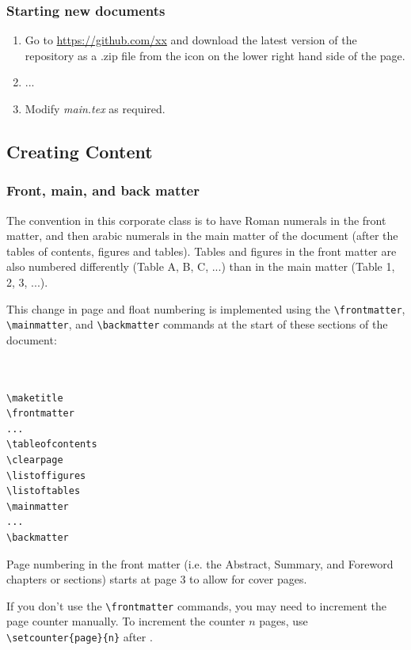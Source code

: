 \subsubsection{Starting new documents}
\begin{enumerate}
\item Go to \href{https://github.com/xx}{https://github.com/xx} and download the latest version of the repository as a .zip file from the icon on the lower right hand side of the page.
\item ...
\item Modify \emph{main.tex} as required.
\end{enumerate}

\subsection{Creating Content}
\subsubsection{Front, main, and back matter}
The convention in this corporate class is to have Roman numerals in the front matter, and then arabic numerals in the main matter of the document (after the tables of contents, figures and tables). Tables and figures in the front matter are also numbered differently (Table A, B, C, ...) than in the main matter (Table 1, 2, 3, ...).

This change in page and float numbering is implemented using the \verb+\frontmatter+, \verb+\mainmatter+, and \verb+\backmatter+ commands at the start of these sections of the document:

\begin{lstlisting}


\maketitle
\frontmatter
...
\tableofcontents
\clearpage
\listoffigures
\listoftables
\mainmatter
...
\backmatter

\end{lstlisting}

Page numbering in the front matter (i.e. the Abstract, Summary, and Foreword chapters or sections) starts at page 3 to allow for cover pages.

If you don't use the \verb+\frontmatter+ commands, you may need to increment the page counter manually. To increment the counter $n$ pages, use \verb+\setcounter{page}{n}+ after \verb++.

